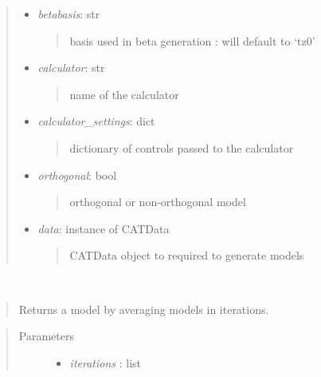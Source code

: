 \documentclass[letterpaper,10pt,english]{sphinxmanual}
\begin{document}
\begin{fulllineitems}
\begin{quote}
\begin{description}
\begin{itemize}
\item {} 
\emph{betabasis}: str
\begin{quote}

basis used in beta generation 
: will default to `tz0'
\end{quote}

\item {} 
\emph{calculator}: str
\begin{quote}

name of the calculator
\end{quote}

\item {} 
\emph{calculator\_settings}: dict
\begin{quote}

dictionary of controls passed to the calculator
\end{quote}

\item {} 
\emph{orthogonal}: bool
\begin{quote}

orthogonal or non-orthogonal model
\end{quote}

\item {} 
\emph{data}: instance of CATData
\begin{quote}

CATData object to required to generate models
\end{quote}

\end{itemize}

\end{description}\end{quote}

\begin{fulllineitems}
\label{classes:catparam.CATParam.average_modelsbx}~\begin{quote}

Returns a model by averaging models in iterations.
\end{quote}
\begin{quote}\begin{description}
\item[{Parameters}] \leavevmode\begin{itemize}
\item {} 
\emph{iterations} : list
\begin{quote}


\end{quote}
\end{itemize}
\end{description}
\end{quote}
\end{fulllineitems}
\end{fulllineitems}
\end{document}
